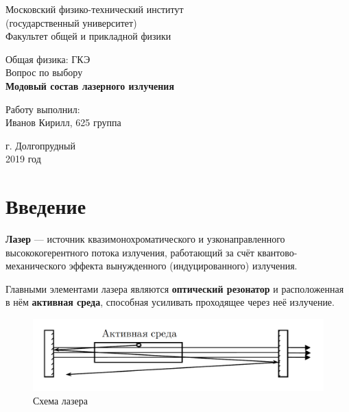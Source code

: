 \documentclass[12pt]{kiarticle}
\begin{document}
	
	\begin{titlepage}
	\begin{center}
		\large 	Московский физико-технический институт \\
		(государственный университет) \\
		Факультет общей и прикладной физики \\
		\vspace{0.2cm}
		
		\vspace{4.5cm}
		\Large{Общая физика: ГКЭ \\ \vspace{0.2cm}
			Вопрос по выбору} \\ \vspace{0.2cm}
		\LARGE \textbf{Модовый состав лазерного излучения}
	\end{center}
	\vspace{2.3cm} \large
	
	\begin{center}
		Работу выполнил: \\
		Иванов Кирилл,
		625 группа
		\vspace{10mm}		
		
	\end{center}
	
	\begin{center} \vspace{60mm}
		г. Долгопрудный \\
		2019 год
	\end{center}
\end{titlepage}



\section{Введение}

\textbf{Лазер} ---  источник квазимонохроматического и узконаправленного высококогерентного потока излучения, работающий за счёт квантово-механического эффекта вынужденного (индуцированного) излучения.

Главными элементами лазера являются \textbf{оптический резонатор} и расположенная в нём \textbf{активная среда}, способная усиливать проходящее через неё излучение.

\begin{figure}[h!]
	\centering
	\includegraphics[width=0.7\linewidth]{laser.png}
	\caption{Схема лазера}
	\label{laser}
\end{figure}
\end{document}
